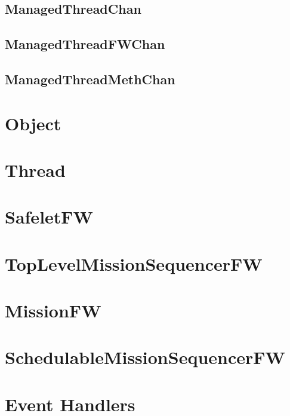 \documentclass{article}
\begin{document}
\begin{plumbing}
\subsection{ManagedThreadChan}


\subsection{ManagedThreadFWChan}


\subsection{ManagedThreadMethChan}

\newpage
\end{plumbing}

\section{Object}

\newpage

\section{Thread}

\newpage

\section{SafeletFW}

\newpage

\section{TopLevelMissionSequencerFW}

\newpage

\section{MissionFW}

\newpage

\section{SchedulableMissionSequencerFW}

\newpage

\section{Event Handlers}
\end{document}
